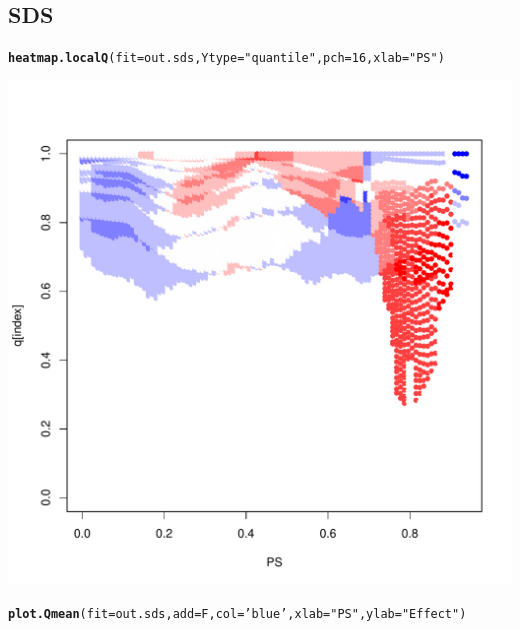 \documentclass{article}\usepackage[]{graphicx}\usepackage[]{color}
\makeatletter
\def\maxwidth{ %
  \ifdim\Gin@nat@width>\linewidth
    \linewidth
  \else
    \Gin@nat@width
  \fi
}
\newcommand{\hlnum}[1]{\textcolor[rgb]{0.686,0.059,0.569}{#1}}%
\newcommand{\hlstr}[1]{\textcolor[rgb]{0.192,0.494,0.8}{#1}}%
\newcommand{\hlstd}[1]{\textcolor[rgb]{0.345,0.345,0.345}{#1}}%
\newcommand{\hlkwc}[1]{\textcolor[rgb]{0.333,0.667,0.333}{#1}}%
\newcommand{\hlkwd}[1]{\textcolor[rgb]{0.737,0.353,0.396}{\textbf{#1}}}%
\newenvironment{kframe}{%
 \def\at@end@of@kframe{}%
 \ifinner\ifhmode%
  \def\at@end@of@kframe{\end{minipage}}%
  \begin{minipage}{\columnwidth}%
 \fi\fi%
 \def\FrameCommand##1{\hskip\@totalleftmargin \hskip-\fboxsep
 \colorbox{shadecolor}{##1}\hskip-\fboxsep
     \hskip-\linewidth \hskip-\@totalleftmargin \hskip\columnwidth}%
 \MakeFramed {\advance\hsize-\width
   \@totalleftmargin\z@ \linewidth\hsize
   \@setminipage}}%
 {\par\unskip\endMakeFramed%
 \at@end@of@kframe}
\newenvironment{knitrout}{}{} %
\makeatother
\begin{document}
\subsection{SDS}
\begin{knitrout}
\color{fgcolor}\begin{kframe}
\begin{alltt}
\hlkwd{heatmap.localQ}\hlstd{(}\hlkwc{fit}\hlstd{=out.sds ,} \hlkwc{Ytype}\hlstd{=}\hlstr{"quantile"} \hlstd{,} \hlkwc{pch}\hlstd{=}\hlnum{16} \hlstd{,} \hlkwc{xlab}\hlstd{=}\hlstr{"PS"}\hlstd{)}
\end{alltt}
\end{kframe}

{\centering \includegraphics[width=\maxwidth]{figures/SDS-heatmap-1} 

}


\begin{kframe}\begin{alltt}
\hlkwd{plot.Qmean}\hlstd{(}\hlkwc{fit}\hlstd{=out.sds ,} \hlkwc{add}\hlstd{=F ,} \hlkwc{col}\hlstd{=}\hlstr{'blue'} \hlstd{,} \hlkwc{xlab}\hlstd{=}\hlstr{"PS"} \hlstd{,} \hlkwc{ylab}\hlstd{=}\hlstr{"Effect"}\hlstd{)}
\end{alltt}
\end{kframe}


\end{knitrout}
\end{document}
